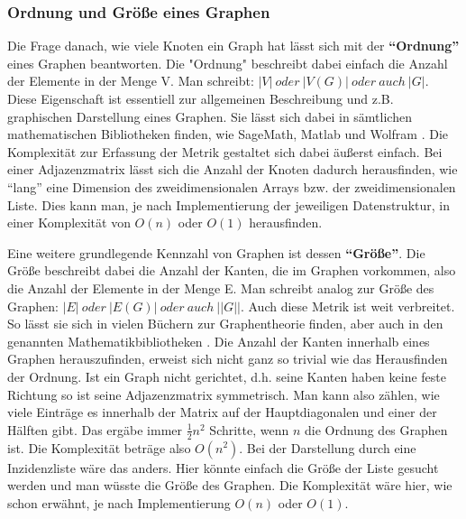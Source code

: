 \documentclass[a4paper,12pt,ngerman,chapterprefix=false,listof=totoc,bibliography=totoc]{scrreprt}
\begin{document}
\subsubsection*{Ordnung und Größe eines Graphen}
{
Die Frage danach, wie viele Knoten ein Graph hat lässt sich mit der \textbf{"`Ordnung"'} eines Graphen beantworten. Die "Ordnung" beschreibt dabei einfach die Anzahl der Elemente in der Menge V. Man schreibt: \(\vert V\vert\ oder\ \vert V(G)\vert\ oder\ auch\ \vert G\vert\). \cite{diestel_graphentheorie_2000} Diese Eigenschaft ist essentiell zur allgemeinen Beschreibung und z.B. graphischen Darstellung eines Graphen. Sie lässt sich dabei in sämtlichen mathematischen Bibliotheken finden, wie SageMath, Matlab und Wolfram \cite{sagemath_graph_2020,matlab_directed_2020,wolfram_graph_2020}. Die Komplexität zur Erfassung der Metrik gestaltet sich dabei äußerst einfach. Bei einer Adjazenzmatrix lässt sich die Anzahl der Knoten dadurch herausfinden, wie "`lang"' eine Dimension des zweidimensionalen Arrays bzw. der zweidimensionalen Liste. Dies kann man, je nach Implementierung der jeweiligen Datenstruktur, in einer Komplexität von \(O(n)\) oder \(O(1)\) herausfinden.

Eine weitere grundlegende Kennzahl von Graphen ist dessen \textbf{"`Größe"'}. Die Größe beschreibt dabei die Anzahl der Kanten, die im Graphen vorkommen, also die Anzahl der Elemente in der Menge E. Man schreibt analog zur Größe des Graphen: \(\vert E\vert\ oder\ \vert E(G)\vert\ oder\ auch\ \vert\vert G \vert\vert\). \cite{balakrishnan_schaums_1997,diestel_graphentheorie_2000} Auch diese Metrik ist weit verbreitet. So lässt sie sich in vielen Büchern zur Graphentheorie finden, aber auch in den genannten Mathematikbibliotheken \cite{sagemath_graph_2020,matlab_directed_2020,wolfram_graph_2020}. Die Anzahl der Kanten innerhalb eines Graphen herauszufinden, erweist sich nicht ganz so trivial wie das Herausfinden der Ordnung. Ist ein Graph nicht gerichtet, d.h. seine Kanten haben keine feste Richtung \cite{diestel_graphentheorie_2000} so ist seine Adjazenzmatrix symmetrisch. Man kann also zählen, wie viele Einträge es innerhalb der Matrix auf der Hauptdiagonalen und einer der Hälften gibt. Das ergäbe immer \(\frac{1}{2}n^2\) Schritte, wenn \(n\) die Ordnung des Graphen ist. Die Komplexität beträge also \(O(n^2)\). Bei der Darstellung durch eine Inzidenzliste wäre das anders. Hier könnte einfach die Größe der Liste gesucht werden und man wüsste die Größe des Graphen. Die Komplexität wäre hier, wie schon erwähnt, je nach Implementierung \(O(n)\) oder \(O(1)\).
}
\end{document}
